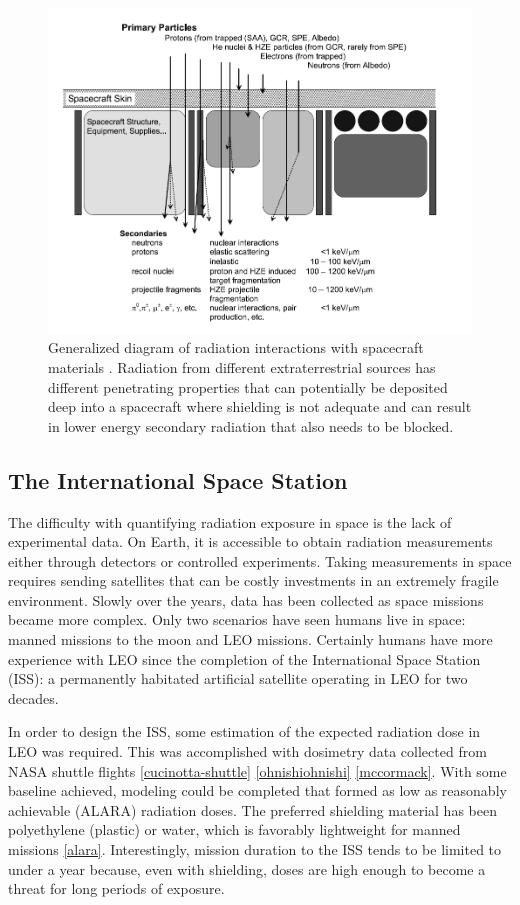 \begin{figure}
\centering
\includegraphics[width=\linewidth]{shield_transport.png}
\caption{Generalized diagram of radiation interactions with spacecraft materials \cite{bentonbenton}. Radiation from different extraterrestrial sources has different penetrating properties that can potentially be deposited deep into a spacecraft where shielding is not adequate and can result in lower energy secondary radiation that also needs to be blocked.}
\label{fig:shield-transport }
\end{figure}

\subsection{The International Space Station}

The difficulty with quantifying radiation exposure in space is the lack of experimental data. On Earth, it is accessible to obtain radiation measurements either through detectors or controlled experiments. Taking measurements in space requires sending satellites that can be costly investments in an extremely fragile environment. Slowly over the years, data has been collected as space missions became more complex. Only two scenarios have seen humans live in space: manned missions to the moon and LEO missions. Certainly humans have more experience with LEO since the completion of the International Space Station (ISS): a permanently habitated artificial satellite operating in LEO for two decades.

In order to design the ISS, some estimation of the expected radiation dose in LEO was required. This was accomplished with dosimetry data collected from NASA shuttle flights \ref{cucinotta-shuttle} \ref{ohnishiohnishi} \ref{mccormack}. With some baseline achieved, modeling could be completed that formed as low as reasonably achievable (ALARA) radiation doses. The preferred shielding material has been polyethylene (plastic) or water, which is favorably lightweight for manned missions \ref{alara}. Interestingly, mission duration to the ISS tends to be limited to under a year because, even with shielding, doses are high enough to become a threat for long periods of exposure.

